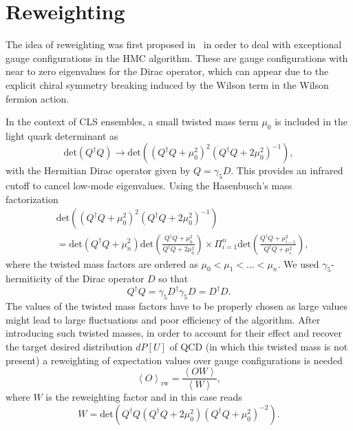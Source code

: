 \section{Reweighting}

The idea of reweighting was first proposed in~\citep{Luscher:2008tw} in order to deal with exceptional gauge configurations in the HMC algorithm. These are gauge configurations with near to zero eigenvalues for the Dirac operator, which can appear due to the explicit chiral symmetry breaking induced by the Wilson term in the Wilson fermion action.

In the context of CLS ensembles, a small twisted mass term $\mu_0$ is included in the light quark determinant as~\citep{Luscher:2012av}
\begin{equation}
\textrm{det}\left(Q^{\dagger}Q\right)\rightarrow\textrm{det}\left(\left(Q^{\dagger}Q+\mu_0^2\right)^2\left(Q^{\dagger}Q+2\mu_0^2\right)^{-1}\right),
\end{equation}
with the Hermitian Dirac operator given by $Q=\gamma_5D$. This provides an infrared cutoff to cancel low-mode eigenvalues. Using the Hasenbusch’s mass factorization~\citep{Hasenbusch:2001ne}
\begin{align}
&\textrm{det}\left(\left(Q^{\dagger}Q+\mu_0^2\right)^2\left(Q^{\dagger}Q+2\mu_0^2\right)^{-1}\right) \\ 
&=\textrm{det}\left(Q^{\dagger}Q+\mu_{n}^2\right)\textrm{det}\left(\frac{Q^{\dagger}Q+\mu_{0}^2}{Q^{\dagger}Q+2\mu_0^2}\right)\times\Pi_{i=1}^{n}\textrm{det}\left(\frac{Q^{\dagger}Q+\mu_{i-1}^2}{Q^{\dagger}Q+\mu_i^2}\right),
\end{align}
where the twisted mass factors are ordered as $\mu_0<\mu_1<...<\mu_{n}$. We used $\gamma_5$-hermiticity of the Dirac operator $D$ so that
\begin{equation}
Q^{\dagger}Q=\gamma_5D^{\dagger}\gamma_5D=D^{\dagger}D.
\end{equation}
The values of the twisted mass factors have to be properly chosen as large values might lead to large fluctuations and poor efficiency of the algorithm. After introducing such twisted masses, in order to account for their effect and recover the target desired distribution $dP[U]$ of QCD (in which this twisted mass is not present) a reweighting of expectation values over gauge configurations is needed
\begin{equation}
\left<O\right>_{\textrm{rw}}=\frac{\left<OW\right>}{\left<W\right>},
\end{equation}
where $W$ is the reweighting factor and in this case reads
\begin{equation}
W=\textrm{det}\left(Q^{\dagger}Q\left(Q^{\dagger}Q+2\mu_0^2\right)\left(Q^{\dagger}Q+\mu_0^2\right)^{-2}\right).
\end{equation}

